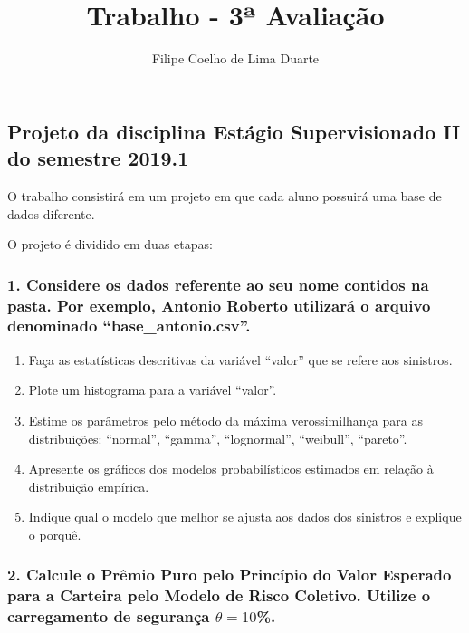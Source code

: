 \documentclass[]{article}
\title{Trabalho - 3ª Avaliação}
\author{Filipe Coelho de Lima Duarte}
\date{}
\begin{document}
\maketitle

\hypertarget{projeto-da-disciplina-estagio-supervisionado-ii-do-semestre-2019.1}{%
\subsection{Projeto da disciplina Estágio Supervisionado II do semestre
2019.1}\label{projeto-da-disciplina-estagio-supervisionado-ii-do-semestre-2019.1}}

O trabalho consistirá em um projeto em que cada aluno possuirá uma base
de dados diferente.

O projeto é dividido em duas etapas:

\hypertarget{considere-os-dados-referente-ao-seu-nome-contidos-na-pasta.-por-exemplo-antonio-roberto-utilizara-o-arquivo-denominado-base_antonio.csv.}{%
\subsubsection{1. Considere os dados referente ao seu nome contidos na
pasta. Por exemplo, Antonio Roberto utilizará o arquivo denominado
``base\_antonio.csv''.}\label{considere-os-dados-referente-ao-seu-nome-contidos-na-pasta.-por-exemplo-antonio-roberto-utilizara-o-arquivo-denominado-base_antonio.csv.}}

\begin{enumerate}
\def\labelenumi{\alph{enumi})}
\item
  Faça as estatísticas descritivas da variável ``valor'' que se refere
  aos sinistros.
\item
  Plote um histograma para a variável ``valor''.
\item
  Estime os parâmetros pelo método da máxima verossimilhança para as
  distribuições: ``normal'', ``gamma'', ``lognormal'', ``weibull'',
  ``pareto''.
\item
  Apresente os gráficos dos modelos probabilísticos estimados em relação
  à distribuição empírica.
\item
  Indique qual o modelo que melhor se ajusta aos dados dos sinistros e
  explique o porquê.
\end{enumerate}

\hypertarget{calcule-o-premio-puro-pelo-principio-do-valor-esperado-para-a-carteira-pelo-modelo-de-risco-coletivo.-utilize-o-carregamento-de-seguranca-theta-10.}{%
\subsubsection{\texorpdfstring{2. Calcule o Prêmio Puro pelo Princípio
do Valor Esperado para a Carteira pelo Modelo de Risco Coletivo. Utilize
o carregamento de segurança
\(\theta = 10\)\%.}{2. Calcule o Prêmio Puro pelo Princípio do Valor Esperado para a Carteira pelo Modelo de Risco Coletivo. Utilize o carregamento de segurança \textbackslash{}theta = 10\%.}}\label{calcule-o-premio-puro-pelo-principio-do-valor-esperado-para-a-carteira-pelo-modelo-de-risco-coletivo.-utilize-o-carregamento-de-seguranca-theta-10.}}
\end{document}
